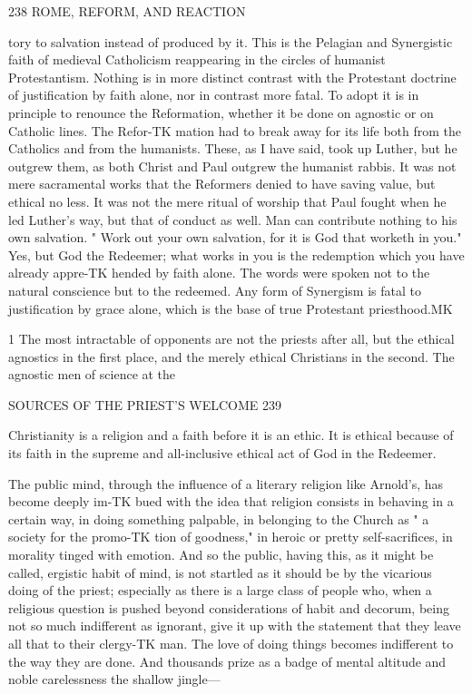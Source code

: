 \documentclass[12pt,a5paper,oneside]{book}
\begin{document}
{238 ROME, REFORM, AND REACTION 

tory to salvation instead of produced by it. This 
is the Pelagian and Synergistic faith of medieval 
Catholicism reappearing in the circles of humanist 
Protestantism. Nothing is in more distinct contrast 
with the Protestant doctrine of justification by faith 
alone, nor in contrast more fatal. To adopt it is in 
principle to renounce the Reformation, whether it be 
done on agnostic or on Catholic lines. The Refor-TK
mation had to break away for its life both from the 
Catholics and from the humanists. These, as I have 
said, took up Luther, but he outgrew them, as both 
Christ and Paul outgrew the humanist rabbis. It was 
not mere sacramental works that the Reformers denied 
to have saving value, but ethical no less. It was not 
the mere ritual of worship that Paul fought when he 
led Luther's way, but that of conduct as well. Man 
can contribute nothing to his own salvation. " Work 
out your own salvation, for it is God that worketh in 
you." Yes, but God the Redeemer; what works in 
you is the redemption which you have already appre-TK
hended by faith alone. The words were spoken not to 
the natural conscience but to the redeemed. Any form 
of Synergism is fatal to justification by grace alone, 
which is the base of true Protestant priesthood.MK 

1 The most intractable of opponents are not the priests after all, 
but the ethical agnostics in the first place, and the merely ethical 
Christians in the second. The agnostic men of science at the 



SOURCES OF THE PRIEST'S WELCOME 239 

Christianity is a religion and a faith before it is an 
ethic. It is ethical because of its faith in the supreme 
and all-inclusive ethical act of God in the Redeemer. 

The public mind, through the influence of a 
literary religion like Arnold's, has become deeply im-TK
bued with the idea that religion consists in behaving 
in a certain way, in doing something palpable, in 
belonging to the Church as " a society for the promo-TK
tion of goodness," in heroic or pretty self-sacrifices, in 
morality tinged with emotion. And so the public, 
having this, as it might be called, ergistic habit of 
mind, is not startled as it should be by the vicarious 
doing of the priest; especially as there is a large class 
of people who, when a religious question is pushed 
beyond considerations of habit and decorum, being 
not so much indifferent as ignorant, give it up with 
the statement that they leave all that to their clergy-TK
man. The love of doing things becomes indifferent 
to the way they are done. And thousands prize as a 
badge of mental altitude and noble carelessness the 
shallow jingle---

}
\end{document}
